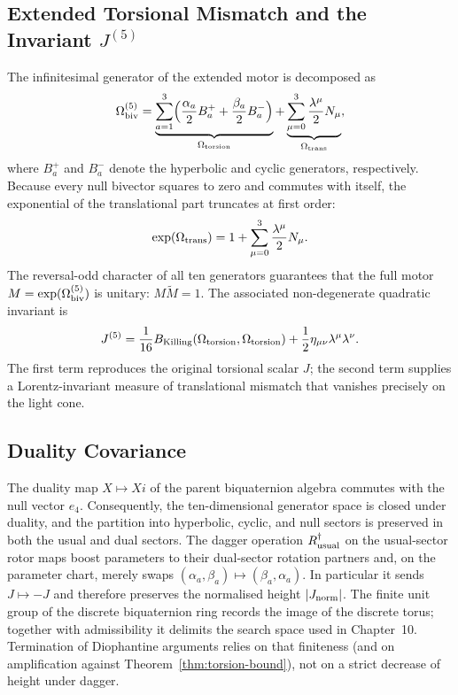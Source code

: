 \documentclass[dvipdfmx,a4paper]{article}
\theoremstyle{definition}
\theoremstyle{remark}
\newcommand{\Jnorm}{J_{\rm norm}}
\begin{document}
\subsection{Extended Torsional Mismatch and the Invariant \texorpdfstring{\( J^{(5)} \)}{J}}

The infinitesimal generator of the extended motor is decomposed as
\[
\Omega_{\rm biv}^{(5)} = \underbrace{\sum_{a=1}^3 \Bigl( \frac{\alpha_a}{2} B_a^+ + \frac{\beta_a}{2} B_a^- \Bigr)}_{\Omega_{\rm torsion}} + \underbrace{\sum_{\mu=0}^3 \frac{\lambda^\mu}{2} N_\mu}_{\Omega_{\rm trans}},
\]
where \( B_a^+ \) and \( B_a^- \) denote the hyperbolic and cyclic generators, respectively. Because every null bivector squares to zero and commutes with itself, the exponential of the translational part truncates at first order:
\[
\exp(\Omega_{\rm trans}) = 1 + \sum_{\mu=0}^3 \frac{\lambda^\mu}{2} N_\mu.
\]
The reversal-odd character of all ten generators guarantees that the full motor \( M = \exp(\Omega_{\rm biv}^{(5)}) \) is unitary: \( M \widetilde{M} = 1 \). The associated non-degenerate quadratic invariant is
\[
J^{(5)} = \frac{1}{16} B_{\rm Killing}(\Omega_{\rm torsion}, \Omega_{\rm torsion}) + \frac{1}{2} \eta_{\mu\nu} \lambda^\mu \lambda^\nu.
\]
The first term reproduces the original torsional scalar \( J \); the second term supplies a Lorentz-invariant measure of translational mismatch that vanishes precisely on the light cone.

\subsection{Duality Covariance}

The duality map \( X \mapsto Xi \) of the parent biquaternion algebra commutes with the null vector \( e_4 \). Consequently, the ten-dimensional generator space is closed under duality, and the partition into hyperbolic, cyclic, and null sectors is preserved in both the usual and dual sectors. The dagger operation \( R_{\rm usual}^\dagger \) on the usual-sector rotor maps boost parameters to their dual-sector rotation partners and, on the parameter chart, merely swaps \((\alpha_a,\beta_a)\mapsto(\beta_a,\alpha_a)\). In particular it sends \(J\mapsto -J\) and therefore preserves the normalised height \(|\Jnorm|\). The finite unit group of the discrete biquaternion ring records the image of the discrete torus; together with admissibility it delimits the search space used in Chapter~10. Termination of Diophantine arguments relies on that finiteness (and on amplification against Theorem~\ref{thm:torsion-bound}), not on a strict decrease of height under dagger.
\end{document}
